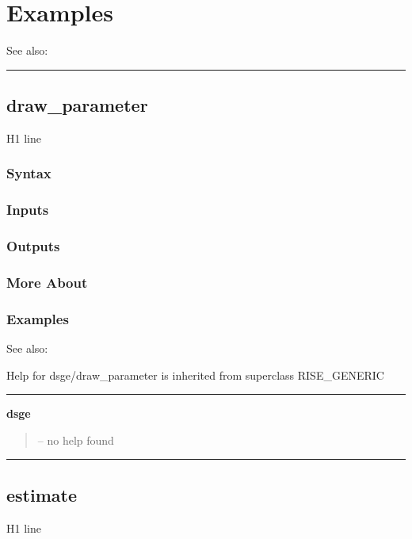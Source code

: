 \documentclass[letterpaper,10pt,english]{sphinxmanual}
\begin{document}
\section{Examples}
\label{classes/models/@dsge/dsge:id23}
See also:


\bigskip\hrule{}\bigskip



\subsection{draw\_parameter}
\label{classes/models/@dsge/dsge:id24}\label{classes/models/@dsge/dsge:draw-parameter}
H1 line


\subsubsection{Syntax}
\label{classes/models/@dsge/dsge:id25}

\subsubsection{Inputs}
\label{classes/models/@dsge/dsge:id26}

\subsubsection{Outputs}
\label{classes/models/@dsge/dsge:id27}

\subsubsection{More About}
\label{classes/models/@dsge/dsge:id28}

\subsubsection{Examples}
\label{classes/models/@dsge/dsge:id29}
See also:

Help for dsge/draw\_parameter is inherited from superclass RISE\_GENERIC


\bigskip\hrule{}\bigskip

\label{classes/models/@dsge/dsge:dsge}
\textbf{dsge}
\begin{quote}

-- no help found
\end{quote}


\bigskip\hrule{}\bigskip



\subsection{estimate}
\label{classes/models/@dsge/dsge:estimate}\label{classes/models/@dsge/dsge:id30}
H1 line
\end{document}
